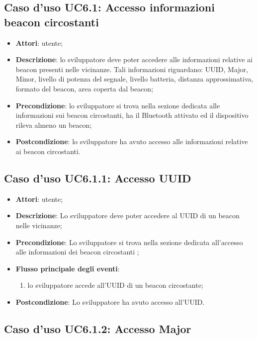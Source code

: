 \documentclass[../AnalisiDeiRequisiti.tex]{subfiles}
\begin{document}
\subsection{Caso d'uso UC6.1: Accesso informazioni beacon circostanti}
\begin{itemize}
\item \textbf{Attori}: utente;
\item \textbf{Descrizione}: lo sviluppatore deve poter accedere alle informazioni relative ai beacon presenti nelle vicinanze. Tali informazioni riguardano: UUID, Major, Minor, livello di potenza del segnale, livello batteria, distanza approssimativa, formato del beacon, area coperta dal beacon; 
      \item \textbf{Precondizione}: lo sviluppatore si trova nella sezione dedicata alle informazioni sui beacon circostanti, ha il Bluetooth attivato ed il dispositivo rileva almeno un beacon;
    \item \textbf{Postcondizione}: lo sviluppatore ha avuto accesso alle informazioni relative ai beacon circostanti.
  \end{itemize}
\hypertarget{UC6.1.1}{}
\subsection{Caso d'uso UC6.1.1: Accesso UUID}
\begin{itemize}
\item \textbf{Attori}: utente;
\item \textbf{Descrizione}: Lo sviluppatore deve poter accedere al UUID di un beacon nelle vicinanze; 
      \item \textbf{Precondizione}: Lo sviluppatore si trova nella sezione dedicata all'accesso alle informazioni dei beacon circostanti ;

        \item \textbf{Flusso principale degli eventi}:
          \begin{enumerate}
          \item lo sviluppatore accede all'UUID di un beacon circostante;

      \end{enumerate}
    \item \textbf{Postcondizione}: Lo sviluppatore ha avuto accesso all'UUID.
  \end{itemize}
\hypertarget{UC6.1.2}{}
\subsection{Caso d'uso UC6.1.2: Accesso Major}
\end{document}
